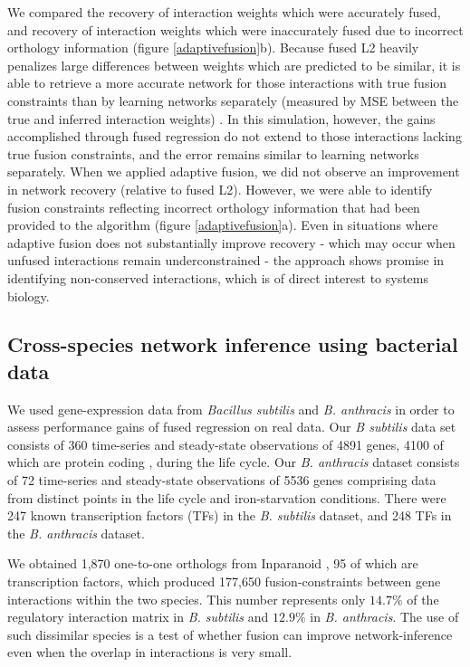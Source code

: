 \documentclass[11pt]{article}
\begin{document}
We compared the recovery of interaction weights which were accurately fused, and recovery of interaction weights which were inaccurately fused due to incorrect orthology information (figure \ref{adaptivefusion}b). Because fused L2 heavily penalizes large differences between weights which are predicted to be similar, it is able to retrieve a more accurate network for those interactions with true fusion constraints than by learning networks separately (measured by MSE between the true and inferred interaction weights) . In this simulation, however, the gains accomplished through fused regression do not extend to those interactions lacking true fusion constraints, and the error remains similar to learning networks separately. When we applied adaptive fusion, we did not observe an improvement in network recovery (relative to fused L2). However, we were able to identify fusion constraints reflecting incorrect orthology information that had been provided to the algorithm (figure \ref{adaptivefusion}a). Even in situations where adaptive fusion does not substantially improve recovery - which may occur when unfused interactions remain underconstrained - the approach shows promise in identifying non-conserved interactions, which is of direct interest to systems biology. 


\subsection{Cross-species network inference using bacterial data}
We used gene-expression data from \textit{Bacillus subtilis} and \textit{B. anthracis} in order to assess performance gains of fused regression on real data. Our \textit{B subtilis} data set consists of 360 time-series and steady-state observations of 4891 genes, 4100 of which are protein coding \cite{kunst_complete_1997}, during the life cycle. Our \textit{\textit{B. anthracis}} dataset consists of 72 time-series and steady-state observations of 5536 genes comprising data from distinct points in the life cycle and iron-starvation conditions. There were 247 known transcription factors (TFs) in the \textit{\textit{B. subtilis}} dataset, and 248 TFs in the \textit{B. anthracis} dataset. 

We obtained 1,870 one-to-one orthologs from Inparanoid \cite{ostlund_inparanoid_2010}, 95 of which are transcription factors, which produced 177,650 fusion-constraints between gene interactions within the two species. This number represents only $14.7\%$ of the regulatory interaction matrix in \textit{B. subtilis} and $12.9\%$ in \textit{B. anthracis}. The use of such dissimilar species is a test of whether fusion can improve network-inference even when the overlap in interactions is very small. 
\end{document}
